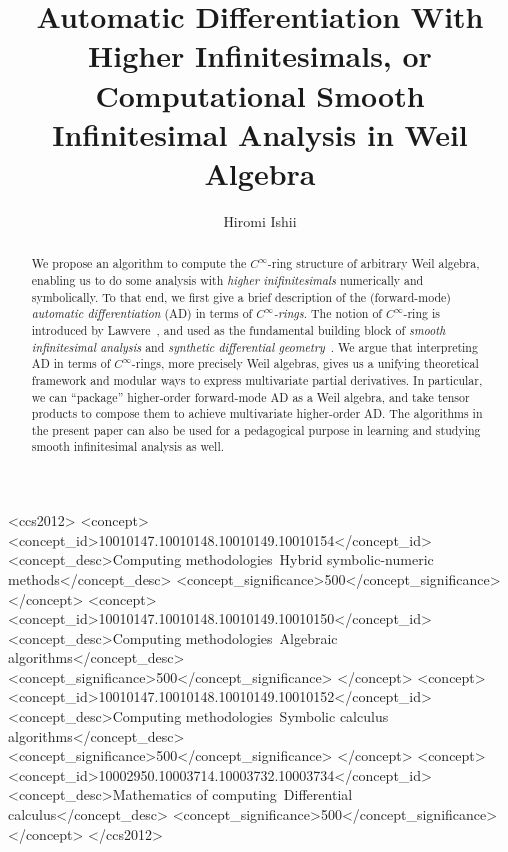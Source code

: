 \documentclass[%
  sigconf,authorversion,screen]{acmart}
\begin{document}
\title[Automatic Differentiation With Higher Infinitesimals]{Automatic Differentiation With Higher Infinitesimals, or Computational Smooth Infinitesimal Analysis in Weil Algebra}

\author{Hiromi Ishii}

\renewcommand{\shortauthors}{Hiromi ISHII}

\begin{abstract}
  \frenchspacing
  We propose an algorithm to compute the $C^\infty$-ring structure of arbitrary Weil algebra, enabling us to do some analysis with \emph{higher inifinitesimals} numerically and symbolically.
  To that end, we first give a brief description of the (forward-mode) \emph{automatic differentiation} (AD) in terms of \emph{$C^\infty$-rings}.
  The notion of $C^\infty$-ring is introduced by Lawvere~\cite{lawvere1979categorical}, and used as the fundamental building block of \emph{smooth infinitesimal analysis} and \emph{synthetic differential geometry}~\cite{Moerdijk:1991aa}.
  We argue that interpreting AD in terms of $C^\infty$-rings, more precisely Weil algebras, gives us a unifying theoretical framework and modular ways to express multivariate partial derivatives.
  In particular, we can ``package'' higher-order forward-mode AD as a Weil algebra, and take tensor products to compose them to achieve multivariate higher-order AD.
  The algorithms in the present paper can also be used for a pedagogical purpose in learning and studying smooth infinitesimal analysis as well.
\end{abstract}

\begin{CCSXML}
<ccs2012>
    <concept>
        <concept_id>10010147.10010148.10010149.10010154</concept_id>
        <concept_desc>Computing methodologies~Hybrid symbolic-numeric methods</concept_desc>
        <concept_significance>500</concept_significance>
        </concept>
    <concept>
        <concept_id>10010147.10010148.10010149.10010150</concept_id>
        <concept_desc>Computing methodologies~Algebraic algorithms</concept_desc>
        <concept_significance>500</concept_significance>
        </concept>
    <concept>
        <concept_id>10010147.10010148.10010149.10010152</concept_id>
        <concept_desc>Computing methodologies~Symbolic calculus algorithms</concept_desc>
        <concept_significance>500</concept_significance>
        </concept>
    <concept>
        <concept_id>10002950.10003714.10003732.10003734</concept_id>
        <concept_desc>Mathematics of computing~Differential calculus</concept_desc>
        <concept_significance>500</concept_significance>
        </concept>
  </ccs2012>
\end{CCSXML}
\end{document}
